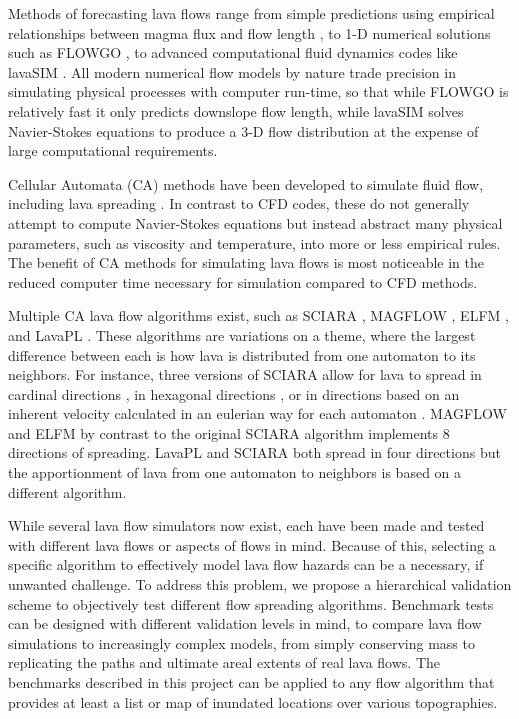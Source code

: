 	Methods of forecasting lava flows range from simple predictions using empirical relationships between magma flux and flow length \citep{Glaze2003}, to 1-D numerical solutions such as FLOWGO \citep{harris2001flowgo}, to advanced computational fluid dynamics codes like lavaSIM \citep{hidaka2005vtfs}. All modern numerical flow models by nature trade precision in simulating physical processes with computer run-time, so that while FLOWGO is relatively fast it only predicts downslope flow length, while lavaSIM solves Navier-Stokes equations to produce a 3-D flow distribution at the expense of large computational requirements.
	
	Cellular Automata (CA) methods have been developed to simulate fluid flow, including lava spreading \citep{barca1994cellular}. In contrast to CFD codes, these do not generally attempt to compute Navier-Stokes equations but instead abstract many physical parameters, such as viscosity and temperature, into more or less empirical rules. The benefit of CA methods for simulating lava flows is most noticeable in the reduced computer time necessary for simulation compared to CFD methods.
	
	Multiple CA lava flow algorithms exist, such as SCIARA \citep{crisci2004simulation}, MAGFLOW \citep{del2008simulations}, ELFM \citep{damiani2006lava}, and LavaPL \citep{connor2012}. These algorithms are variations on a theme, where the largest difference between each is how lava is distributed from one automaton to its neighbors. For instance, three versions of SCIARA allow for lava to spread in cardinal directions \citep{barca1994cellular}, in hexagonal directions \citep{crisci2008lava}, or in directions based on an inherent velocity calculated in an eulerian way for each automaton \citep{avolio2006sciara}. MAGFLOW and ELFM by contrast to the original SCIARA algorithm implements 8 directions of spreading. LavaPL and SCIARA both spread in four directions but the apportionment of lava from one automaton to neighbors is based on a different algorithm.

	While several lava flow simulators now exist, each have been made and tested with different lava flows or aspects of flows in mind. Because of this, selecting a specific algorithm to effectively model lava flow hazards can be a necessary, if unwanted challenge. To address this problem, we propose a hierarchical validation scheme to objectively test different flow spreading algorithms. Benchmark tests can be designed with different validation levels in mind, to compare lava flow simulations to increasingly complex models, from simply conserving mass to replicating the paths and ultimate areal extents of real lava flows. The benchmarks described in this project can be applied to any flow algorithm that provides at least a list or map of inundated locations over various topographies.

